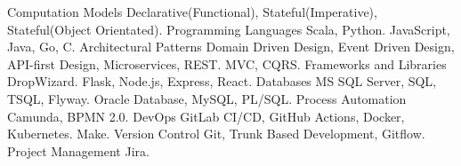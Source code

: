 \begin{cvskills}
  \cvskill
    {Computation Models} %
    { Declarative(Functional), Stateful(Imperative), Stateful(Object Orientated).} 
  \cvskill
    {Programming Languages} %
    {  Scala, Python.}
  \cvskill
    {} %
    {  JavaScript, Java, Go, C.}
  \cvskill
    {Architectural Patterns} %
    {  Domain Driven Design, Event Driven Design, API-first Design, Microservices, REST.}
  \cvskill
    {} %
    {  MVC, CQRS.}
  \cvskill
    {Frameworks and Libraries} %
    {  DropWizard.}
  \cvskill
    {}
    {  Flask, Node.js, Express, React.}
  \cvskill
  {Databases} %
  {  MS SQL Server, SQL, TSQL, Flyway.}
  \cvskill
  {} %
  {  Oracle Database, MySQL, PL/SQL.}
  \cvskill
    {Process Automation}
    { Camunda, BPMN 2.0.}
  \cvskill
    {DevOps} %
    { GitLab CI/CD, GitHub Actions, Docker, Kubernetes.} %
  \cvskill
    {} %
    {  Make.}
  \cvskill
  {Version Control} %
  { Git, Trunk Based Development, Gitflow.} %
  \cvskill
  {Project Management} %
  { Jira.} %
\end{cvskills}
